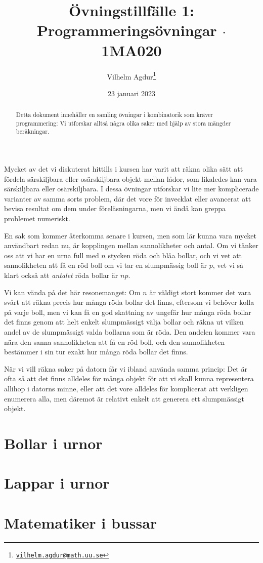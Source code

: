 \documentclass[nobib]{tufte-handout}
\title{Övningstillfälle 1: Programmeringsövningar $\cdot$ 1MA020}
\author[Vilhelm Agdur]{Vilhelm Agdur\thanks{\href{mailto:vilhelm.agdur@math.uu.se}{\nolinkurl{vilhelm.agdur@math.uu.se}}}}
\date{23 januari 2023}
\begin{document}
\maketitle%

\begin{abstract}
\noindent
Detta dokument innehåller en samling övningar i kombinatorik som kräver programmering: Vi utforskar alltså några olika saker med hjälp av stora mängder beräkningar.
\end{abstract}

Mycket av det vi diskuterat hittills i kursen har varit att räkna olika sätt att fördela särskiljbara eller osärskiljbara objekt mellan lådor, som likaledes kan vara särskiljbara eller osärskiljbara. I dessa övningar utforskar vi lite mer komplicerade varianter av samma sorts problem, där det vore för invecklat eller avancerat att bevisa resultat om dem under föreläsningarna, men vi ändå kan greppa problemet numeriskt.

En sak som kommer återkomma senare i kursen, men som lär kunna vara mycket användbart redan nu, är kopplingen mellan sannolikheter och antal. Om vi tänker oss att vi har en urna full med $n$ stycken röda och blåa bollar, och vi vet att sannolikheten att få en röd boll om vi tar en slumpmässig boll är $p$, vet vi så klart också att \emph{antalet} röda bollar är $np$.

Vi kan vända på det här resonemanget: Om $n$ är väldigt stort kommer det vara svårt att räkna precis hur många röda bollar det finns, eftersom vi behöver kolla på varje boll, men vi kan få en god skattning av ungefär hur många röda bollar det finns genom att helt enkelt slumpmässigt välja bollar och räkna ut vilken andel av de slumpmässigt valda bollarna som är röda. Den andelen kommer vara nära den sanna sannolikheten att få en röd boll, och den sannolikheten bestämmer i sin tur exakt hur många röda bollar det finns.

När vi vill räkna saker på datorn får vi ibland använda samma princip: Det är ofta så att det finns alldeles för många objekt för att vi skall kunna representera allihop i datorns minne, eller att det vore alldeles för komplicerat att verkligen enumerera alla, men däremot är relativt enkelt att generera ett slumpmässigt objekt.

\section{Bollar i urnor}

\section{Lappar i urnor}

\section{Matematiker i bussar}


%
%
\end{document}
